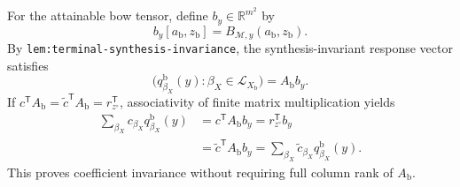 For the attainable bow tensor, define \(b_y\in\mathbb R^{m^2}\) by
\[
 b_y[a_{\mathrm b},z_{\mathrm b}]=B_{\mathcal M,y}(a_{\mathrm b},z_{\mathrm b}).
\]
By \texttt{lem:terminal-synthesis-invariance}, the synthesis-invariant response vector satisfies
\[
 \bigl(q^{\mathrm b}_{\beta_X}(y):\beta_X\in\mathcal L_{X_{\mathrm b}}\bigr)
 =A_{\mathrm b}b_y.
\]
If \(c^{\mathsf T}A_{\mathrm b}=\widetilde c^{\mathsf T}A_{\mathrm b}=r_{z^{\circ}}^{\mathsf T}\), associativity of finite matrix multiplication yields
\[
\begin{aligned}
 \sum_{\beta_X}c_{\beta_X}q^{\mathrm b}_{\beta_X}(y)
 &=c^{\mathsf T}A_{\mathrm b}b_y
 =r_{z^{\circ}}^{\mathsf T}b_y\\
 &=\widetilde c^{\mathsf T}A_{\mathrm b}b_y
 =\sum_{\beta_X}\widetilde c_{\beta_X}q^{\mathrm b}_{\beta_X}(y).
\end{aligned}
\]
This proves coefficient invariance without requiring full column rank of \(A_{\mathrm b}\).